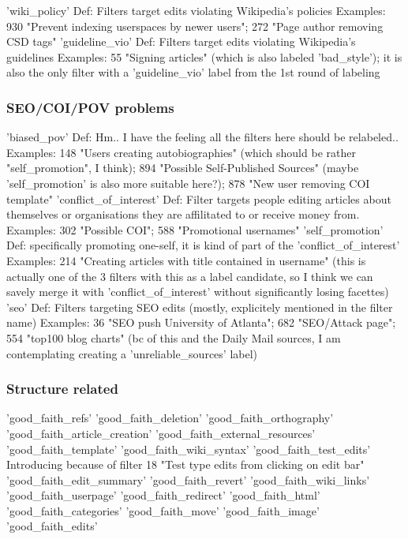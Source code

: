 'wiki\_policy'
  Def: Filters target edits violating Wikipedia's policies
  Examples: 930 "Prevent indexing userspaces by newer users"; 272 "Page author removing CSD tags"
'guideline\_vio'
  Def: Filters target edits violating Wikipedia's guidelines %
  Examples: 55 "Signing articles" (which is also labeled 'bad\_style'); it is also the only filter with a 'guideline\_vio' label from the 1st round of labeling

\subsubsection{SEO/COI/POV problems}

'biased\_pov'
  Def: Hm.. I have the feeling all the filters here should be relabeled..
  Examples: 148 "Users creating autobiographies" (which should be rather "self\_promotion", I think); 894 "Possible Self-Published Sources" (maybe 'self\_promotion' is also more suitable here?); 878 "New user removing COI template"
'conflict\_of\_interest'
  Def: Filter targets people editing articles about themselves or organisations they are affilitated to or receive money from.
  Examples: 302 "Possible COI"; 588 "Promotional usernames"
'self\_promotion'
  Def: specifically promoting one-self, it is kind of part of the 'conflict\_of\_interest'
  Examples: 214 "Creating articles with title contained in username" (this is actually one of the 3 filters with this as a label candidate, so I think we can savely merge it with 'conflict\_of\_interest' without significantly losing facettes)
'seo'
  Def: Filters targeting SEO edits (mostly, explicitely mentioned in the filter name)
  Examples: 36 "SEO push University of Atlanta"; 682 "SEO/Attack page"; 554 "top100 blog charts" (bc of this and the Daily Mail sources, I am contemplating creating a 'unreliable\_sources' label)

\subsubsection{Structure related}
'good\_faith\_refs'
'good\_faith\_deletion'
'good\_faith\_orthography'
'good\_faith\_article\_creation'
'good\_faith\_external\_resources'
'good\_faith\_template'
'good\_faith\_wiki\_syntax'
'good\_faith\_test\_edits'
Introducing because of filter 18 "Test type edits from clicking on edit bar"
'good\_faith\_edit\_summary'
'good\_faith\_revert'
'good\_faith\_wiki\_links'
'good\_faith\_userpage'
'good\_faith\_redirect'
'good\_faith\_html'
'good\_faith\_categories'
'good\_faith\_move'
'good\_faith\_image'
'good\_faith\_edits'


